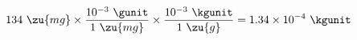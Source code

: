 
\begin{equation*}
  134\ \zu{mg} \times \frac{10^{-3}\ \gunit}{1\ \zu{mg}} \times \frac{10^{-3}\ \kgunit}{1\ \zu{g}} = 1.34\times10^{-4}\ \kgunit
\end{equation*}



